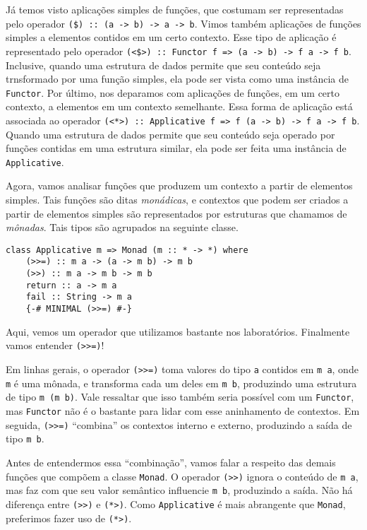 \documentclass[a4paper]{article}
\begin{document}
Já temos visto aplicações simples de funções, que costumam ser representadas pelo operador \mbox{\texttt{(\$) :: (a -> b) -> a -> b}}.
Vimos também aplicações de funções simples a elementos contidos em um certo contexto.
Esse tipo de aplicação é representado pelo operador \mbox{\texttt{(<\$>) :: Functor f => (a -> b) -> f a -> f b}}.
Inclusive, quando uma estrutura de dados permite que seu conteúdo seja trnsformado por uma função simples, ela pode ser vista como uma instância de \texttt{Functor}.
Por último, nos deparamos com aplicações de funções, em um certo contexto, a elementos em um contexto semelhante.
Essa forma de aplicação está associada ao operador \mbox{\texttt{(<*>) :: Applicative f => f (a -> b) -> f a -> f b}}.
Quando uma estrutura de dados permite que seu conteúdo seja operado por funções contidas em uma estrutura similar, ela pode ser feita uma instância de \texttt{Applicative}.

Agora, vamos analisar funções que produzem um contexto a partir de elementos simples.
Tais funções são ditas \emph{monádicas}, e contextos que podem ser criados a partir de elementos simples são representados por estruturas que chamamos de \emph{mônadas}.
Tais tipos são agrupados na seguinte classe.

\begin{verbatim}
class Applicative m => Monad (m :: * -> *) where
	(>>=) :: m a -> (a -> m b) -> m b
	(>>) :: m a -> m b -> m b
	return :: a -> m a
	fail :: String -> m a
	{-# MINIMAL (>>=) #-}
\end{verbatim}

Aqui, vemos um operador que utilizamos bastante nos laboratórios.
Finalmente vamos entender \texttt{(>>=)}!

Em linhas gerais, o operador \texttt{(>>=)} toma valores do tipo \texttt{a} contidos em \texttt{m a}, onde \texttt{m} é uma mônada, e transforma cada um deles em \texttt{m b}, produzindo uma estrutura de tipo \texttt{m (m b)}.
Vale ressaltar que isso também seria possível com um \texttt{Functor}, mas \texttt{Functor} não é o bastante para lidar com esse aninhamento de contextos.
Em seguida, \texttt{(>>=)} ``combina'' os contextos interno e externo, produzindo a saída de tipo \texttt{m b}.

Antes de entendermos essa ``combinação'', vamos falar a respeito das demais funções que compõem a classe \texttt{Monad}.
O operador \texttt{(>>)} ignora o conteúdo de \texttt{m a}, mas faz com que seu valor semântico influencie \texttt{m b}, produzindo a saída.
Não há diferença entre \texttt{(>>)} e \texttt{(*>)}.
Como \texttt{Applicative} é mais abrangente que \texttt{Monad}, preferimos fazer uso de \texttt{(*>)}.
\end{document}
